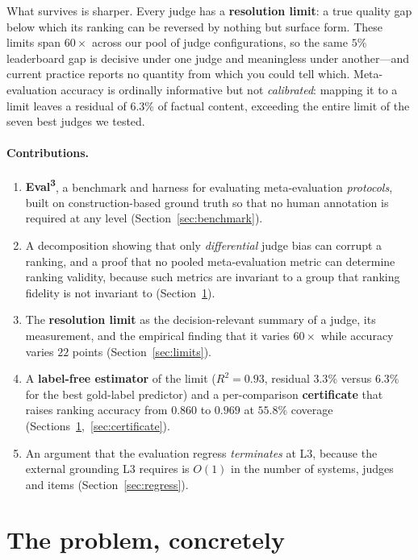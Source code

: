 \documentclass{article}
\theoremstyle{plain}
\theoremstyle{definition}
\begin{document}
What survives is sharper. Every judge has a \textbf{resolution limit}: a true quality gap below
which its ranking can be reversed by nothing but surface form. These limits span $60\times$
across our pool of judge configurations, so the same $5\%$ leaderboard gap is decisive under one judge and
meaningless under another---and current practice reports no quantity from which you could tell
which. Meta-evaluation accuracy is ordinally informative but not \emph{calibrated}: mapping it
to a limit leaves a residual of $6.3\%$ of factual content, exceeding the entire limit of the
seven best judges we tested.

\paragraph{Contributions.}
\begin{enumerate}\itemsep1pt
\item \textbf{Eval\textsuperscript{3}}, a benchmark and harness for evaluating
meta-evaluation \emph{protocols}, built on construction-based ground truth so that no human
annotation is required at any level (Section~\ref{sec:benchmark}).
\item A decomposition showing that only \emph{differential} judge bias can corrupt a
ranking, and a proof that no pooled meta-evaluation metric can determine ranking validity,
because such metrics are invariant to a group that ranking fidelity is not invariant to
(Section~\ref{sec:theory}).
\item The \textbf{resolution limit} as the decision-relevant summary of a judge, its
measurement, and the empirical finding that it varies $60\times$ while accuracy varies $22$
points (Section~\ref{sec:limits}).
\item A \textbf{label-free estimator} of the limit ($R^2=0.93$, residual $3.3\%$ versus
$6.3\%$ for the best gold-label predictor) and a per-comparison \textbf{certificate} that
raises ranking accuracy from $0.860$ to $0.969$ at $55.8\%$ coverage
(Sections~\ref{sec:theory},~\ref{sec:certificate}).
\item An argument that the evaluation regress \emph{terminates} at L3, because the external
grounding L3 requires is $O(1)$ in the number of systems, judges and items
(Section~\ref{sec:regress}).
\end{enumerate}
\section{The problem, concretely}
\label{sec:theory}
\end{document}
